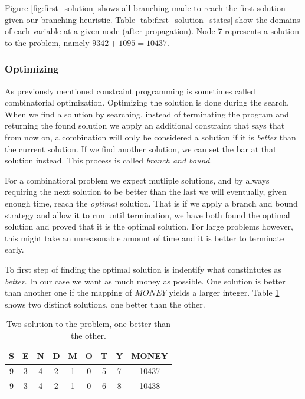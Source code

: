 Figure \ref{fig:first_solution} shows all branching made to reach the first solution given
our branching heuristic. Table \ref{tab:first_solution_states} show the domains of each
variable at a given node (after propagation). Node 7 represents a solution to the problem,
namely $9342+1095=10437$.

\subsubsection{Optimizing}

As previously mentioned constraint programming is sometimes called combinatorial optimization.
Optimizing the solution is done during the search. When we find a solution by searching,
instead of terminating the program and returning the found solution we apply an additional
constraint that says that from now on, a combination will only be considered a solution
if it is \textit{better} than the current solution. If we find another solution, we can
set the bar at that solution instead. This process is called \textit{branch and bound}.

For a combinatioral problem we expect mutliple solutions, and by always requiring the
next solution to be better than the last we will eventually, given enough time, reach
the \textit{optimal} solution. That is if we apply a branch and bound strategy and allow
it to run until termination, we have both found the optimal solution and proved that it is
the optimal solution. For large problems however, this might take an unreasonable amount
of time and it is better to terminate early.

To first step of finding the optimal solution is indentify what constintutes as \textit{
	better}. In our case we want as much money as possible. One solution is better than
another one if the mapping of $MONEY$ yields a larger integer. Table \ref{tab:two_solutions}
shows two distinct solutions, one better than the other.

\begin{table}
	\centering
	\begin{tabular}{c|c|c|c|c|c|c|c|c}
		S & E & N & D & M & O & T & Y & MONEY \\
		\hline
		9 & 3 & 4 & 2 & 1 & 0 & 5 & 7 & 10437 \\
		9 & 3 & 4 & 2 & 1 & 0 & 6 & 8 & 10438 \\
	\end{tabular}
	\caption{Two solution to the problem, one better than the other.}
	\label{tab:two_solutions}
\end{table}


